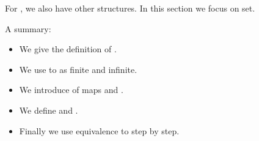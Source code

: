 \documentclass{article}
\begin{document}
 
 
For , we also have other structures. In this section we focus on set. 

A summary:
\begin{itemize}[$\blacktriangleright$]
\item We give the definition of .
\item We use  to  as finite and infinite.
\item We introduce  of maps and .
\item We define  and .
\item Finally we use equivalence to  step by step.
\end{itemize}
\end{document}
